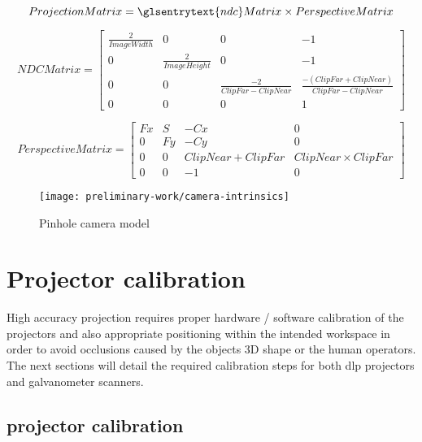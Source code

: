 \begin{equation}\label{eq:projection-matrix}
	ProjectionMatrix = \glsentrytext{ndc}Matrix \times PerspectiveMatrix
\end{equation}

\begin{equation}\label{eq:ndc-matrix}
	NDCMatrix = 
	\begin{bmatrix}
		\frac{2}{ImageWidth} & 0 & 0 & -1 \\
		0 & \frac{2}{ImageHeight} & 0 & -1 \\
		0 & 0 & \frac{-2}{ClipFar - ClipNear} & \frac{-(ClipFar + ClipNear)}{ClipFar - ClipNear} \\
		0 & 0 & 0 & 1
	\end{bmatrix}
\end{equation}


\begin{equation}\label{eq:perspective-matrix}
	PerspectiveMatrix = 
	\begin{bmatrix}
		Fx & S & -Cx & 0 \\
		0 & Fy & -Cy & 0 \\
		0 & 0 & ClipNear + ClipFar & ClipNear \times ClipFar \\
		0 & 0 & -1 & 0
	\end{bmatrix}
\end{equation}


\begin{figure}[H]
	\centering
	\texttt{[image: preliminary-work/camera-intrinsics]}
	\caption[Pinhole camera model]{Pinhole camera model\protect\footnotemark}
	\label{fig:camera-intrinsics}
\end{figure}


\section{Projector calibration}

High accuracy projection requires proper hardware / software calibration of the projectors and also appropriate positioning within the intended workspace in order to avoid occlusions caused by the objects 3D shape or the human operators. The next sections will detail the required calibration steps for both \gls{dlp} projectors and galvanometer scanners.


\subsection{ projector calibration}

